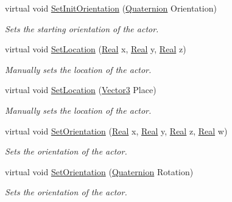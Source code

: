\begin{DoxyCompactItemize}
virtual void \hyperlink{classMezzanine_1_1ActorSoft_a8ee3cce8eb7578cdeb2af771f16ab240}{Set\-Init\-Orientation} (\hyperlink{classMezzanine_1_1Quaternion}{Quaternion} Orientation)
\begin{DoxyCompactList}\small\item\em Sets the starting orientation of the actor. \end{DoxyCompactList}\item 
virtual void \hyperlink{classMezzanine_1_1ActorSoft_aad9c559bae769ac44d437a0612934bc2}{Set\-Location} (\hyperlink{namespaceMezzanine_a726731b1a7df72bf3583e4a97282c6f6}{Real} x, \hyperlink{namespaceMezzanine_a726731b1a7df72bf3583e4a97282c6f6}{Real} y, \hyperlink{namespaceMezzanine_a726731b1a7df72bf3583e4a97282c6f6}{Real} z)
\begin{DoxyCompactList}\small\item\em Manually sets the location of the actor. \end{DoxyCompactList}\item 
virtual void \hyperlink{classMezzanine_1_1ActorSoft_a9c96f61e8a39fc6b35eb35c03b8e0e42}{Set\-Location} (\hyperlink{classMezzanine_1_1Vector3}{Vector3} Place)
\begin{DoxyCompactList}\small\item\em Manually sets the location of the actor. \end{DoxyCompactList}\item 
virtual void \hyperlink{classMezzanine_1_1ActorSoft_aa203dd4d6bde54f4551673e2690f20b8}{Set\-Orientation} (\hyperlink{namespaceMezzanine_a726731b1a7df72bf3583e4a97282c6f6}{Real} x, \hyperlink{namespaceMezzanine_a726731b1a7df72bf3583e4a97282c6f6}{Real} y, \hyperlink{namespaceMezzanine_a726731b1a7df72bf3583e4a97282c6f6}{Real} z, \hyperlink{namespaceMezzanine_a726731b1a7df72bf3583e4a97282c6f6}{Real} w)
\begin{DoxyCompactList}\small\item\em Sets the orientation of the actor. \end{DoxyCompactList}\item 
virtual void \hyperlink{classMezzanine_1_1ActorSoft_a3490444768316d69b5560d3500550a4f}{Set\-Orientation} (\hyperlink{classMezzanine_1_1Quaternion}{Quaternion} Rotation)
\begin{DoxyCompactList}\small\item\em Sets the orientation of the actor. \end{DoxyCompactList}\end{DoxyCompactItemize}
